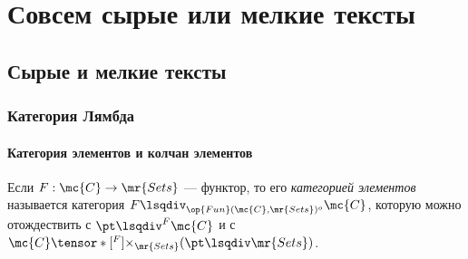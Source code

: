 \documentclass[
	extrafontsizes,
	11pt,
	hyphens,
]{memoir}
\begin{document}
%




\part{Совсем сырые или мелкие тексты}



%



\chapter{Сырые и мелкие тексты}


\section{Категория Лямбда}

\subsection{Категория элементов и колчан элементов}

\begin{definition}
Если \(F : \mc{C} \to \mr{Sets}\) --- функтор, то его \emph{категорией элементов} называется категория
\(F \lsqdiv_{\op{Fun}(\mc{C},\mr{Sets})^o} \mc{C}\),
которую можно отождествить с
\(\pt \lsqdiv^F \mc{C}\) и с \(\mc{C} \tensor*[^F]{\times}{_{\mr{Sets}}} (\pt \lsqdiv \mr{Sets})\).
\end{definition}
\end{document}
